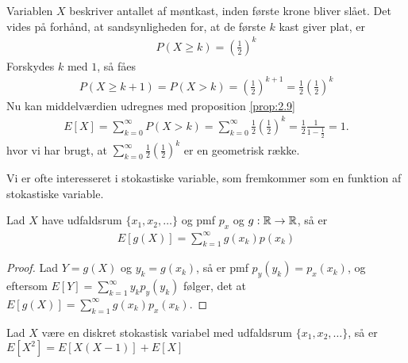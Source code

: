 \begin{exmp}
  Variablen $X$ beskriver antallet af møntkast, inden første krone bliver slået. Det vides på forhånd, at sandsynligheden for, at de første $k$ kast giver plat, er
    \begin{align*}
        P(X\geq k)=\left(\frac{1}{2}\right)^k
    \end{align*}
    Forskydes $k$ med $1$, så fåes
    \begin{align*}
        P(X\geq k+1)=P(X>k)=\left(\frac{1}{2}\right)^{k+1}=\frac{1}{2}\left(\frac{1}{2}\right)^k
    \end{align*}
    Nu kan middelværdien udregnes med proposition \ref{prop:2.9}
    \begin{align*}
        E[X]=\sum_{k=0}^\infty P(X>k)=\sum_{k=0}^\infty\frac{1}{2}\left(\frac{1}{2}\right)^k=\frac{1}{2}\frac{1}{1-\frac{1}{2}}=1.
    \end{align*}
    hvor vi har brugt, at $\sum_{k=0}^\infty\frac{1}{2}\left(\frac{1}{2}\right)^k$ er en geometrisk række.
\end{exmp}
Vi er ofte interesseret i stokastiske variable, som fremkommer som en funktion af stokastiske variable.

\begin{prop} \label{prop 2.12} %
Lad $X$ have udfaldsrum $\{x_1,x_2,\ldots\}$ og pmf $p_x$ og $g:\mathbb{R}\to \mathbb{R}$, så er
\begin{align*}
    E[g(X)] = \sum_{k=1}^\infty g(x_k)p(x_k)
\end{align*}
\end{prop}
\begin{proof}
Lad $Y = g(X)$ og $y_k = g(x_k)$, så er pmf $p_y(y_k) = p_x(x_k)$, og eftersom 
$E[Y] = \sum^\infty_{k = 1} y_k p_y(y_k)$
følger, det at $E[g(X)] = \sum^\infty_{k = 1} g(x_k) p_x(x_k)$.
\end{proof}

\begin{lem} \label{lem:middelværdiAfX2}
Lad $X$ være en diskret stokastisk variabel med udfaldsrum $\{x_1, x_2, \ldots\}$, så er $E[X^2] = E[X(X-1)] + E[X]$
\end{lem}

